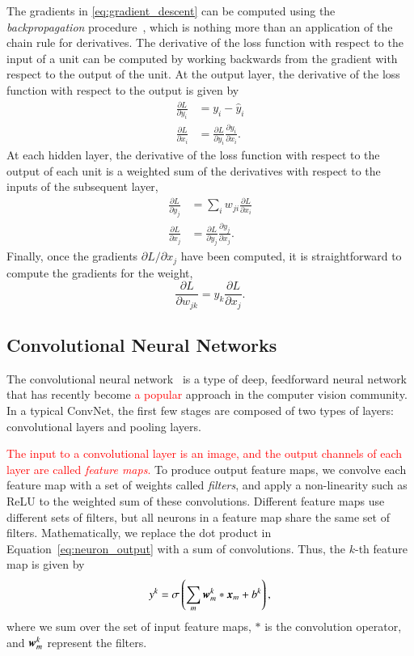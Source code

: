 \documentclass[fleqn,usenatbib]{mnras}
\newcommand{\changed}[1]{\textcolor{red}{#1}}
\begin{document}
The gradients in \ref{eq:gradient_descent} can be computed using the
\textit{backpropagation} procedure~\citep{rumelhart1988learning},
which is nothing more than an application of the chain rule for derivatives.
The derivative of the loss function with respect to the input of a unit can be
computed by working backwards from the gradient with respect to the output of
the unit.
At the output layer, the derivative of the loss function with respect to the
output is given by
\begin{align}
  \frac{ \partial L }{ \partial y_i } &= y_i - \hat{y}_i \\
  \frac{ \partial L }{ \partial x_i } &=
    \frac{ \partial L }{ \partial y_i }
    \frac{ \partial y_i }{ \partial x_i }.
\end{align}
At each hidden layer, the derivative of the loss function with respect to the
output of each unit is a weighted sum of the derivatives with respect to the
inputs of the subsequent layer,
\begin{align}
  \frac{ \partial L }{ \partial y_j } &=
    \sum_{i} w_{ji} \frac{ \partial L }{ \partial x_i}   \\
  \frac{ \partial L }{ \partial x_j } &=
    \frac{ \partial L }{ \partial y_j }
    \frac{ \partial y_j }{ \partial x_j }.
\end{align}
Finally, once the gradients $\partial L / \partial x_j$ have been
computed, it is straightforward to compute the gradients for the weight,
\begin{equation}
\frac{\partial L}{\partial w_{jk}} = y_k \frac{\partial L}{\partial x_j}.
\end{equation}

\subsection{Convolutional Neural Networks}
  \label{sec:convnet}

The convolutional neural network~\citep[ConvNet;][]{fukushima1980neocognitron,lecun1998gradient}
is a type of deep, feedforward neural network
that has recently become
\changed{
a popular
}
approach in the computer vision community.
In a typical ConvNet, the first few stages are composed of two types of layers: 
convolutional layers and pooling layers.

\changed{
The input to a convolutional layer is an image, and the output channels of
each layer are called \textit{feature maps}.
}
To produce output feature maps, we convolve each feature map with a set of weights
called \textit{filters},
and apply a non-linearity such as ReLU to the weighted sum of these convolutions.
Different feature maps use different sets of filters,
but all neurons in a feature map share the same set of filters.
Mathematically, we replace the dot product in Equation~\ref{eq:neuron_output}
with a sum of convolutions. Thus, the $k$-th feature map is given by
\begin{equation}
  y^k = \sigma \left( \sum_{m} \bmath{w}_m^k \ast \bmath{x}_m + b^k \right),
\end{equation}
where we sum over the set of input feature maps,
$\ast$ is the convolution operator, and $\bmath{w}_m^k$ represent the filters.
\end{document}

